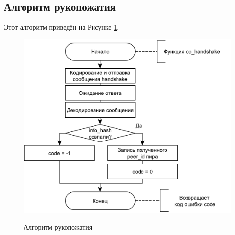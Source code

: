 \subsection{Алгоритм рукопожатия}
Этот алгоритм приведён на Рисунке \ref{fig202:image}.
\begin{figure}[h]
	\begin{center}
		{\includegraphics[scale = 0.75]{img/handshake.pdf}}
		\caption{Алгоритм рукопожатия}
		\label{fig202:image}
	\end{center}
\end{figure}

\newpage

